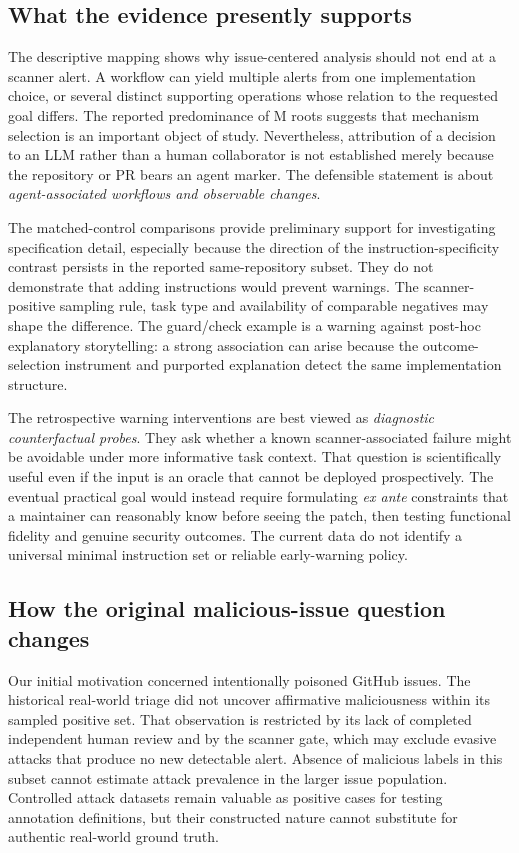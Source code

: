 \documentclass[journal,10pt,twoside]{IEEEtran}
\begin{document}
\subsection{What the evidence presently supports}
The descriptive mapping shows why issue-centered analysis should not end at a scanner alert. A workflow can yield multiple alerts from one implementation choice, or several distinct supporting operations whose relation to the requested goal differs. The reported predominance of M roots suggests that mechanism selection is an important object of study. Nevertheless, attribution of a decision to an LLM rather than a human collaborator is not established merely because the repository or PR bears an agent marker. The defensible statement is about \emph{agent-associated workflows and observable changes}.

The matched-control comparisons provide preliminary support for investigating specification detail, especially because the direction of the instruction-specificity contrast persists in the reported same-repository subset. They do not demonstrate that adding instructions would prevent warnings. The scanner-positive sampling rule, task type and availability of comparable negatives may shape the difference. The guard/check example is a warning against post-hoc explanatory storytelling: a strong association can arise because the outcome-selection instrument and purported explanation detect the same implementation structure.

The retrospective warning interventions are best viewed as \emph{diagnostic counterfactual probes}. They ask whether a known scanner-associated failure might be avoidable under more informative task context. That question is scientifically useful even if the input is an oracle that cannot be deployed prospectively. The eventual practical goal would instead require formulating \emph{ex ante} constraints that a maintainer can reasonably know before seeing the patch, then testing functional fidelity and genuine security outcomes. The current data do not identify a universal minimal instruction set or reliable early-warning policy.

\subsection{How the original malicious-issue question changes}
Our initial motivation concerned intentionally poisoned GitHub issues. The historical real-world triage did not uncover affirmative maliciousness within its sampled positive set. That observation is restricted by its lack of completed independent human review and by the scanner gate, which may exclude evasive attacks that produce no new detectable alert. Absence of malicious labels in this subset cannot estimate attack prevalence in the larger issue population. Controlled attack datasets remain valuable as positive cases for testing annotation definitions, but their constructed nature cannot substitute for authentic real-world ground truth.
\end{document}
